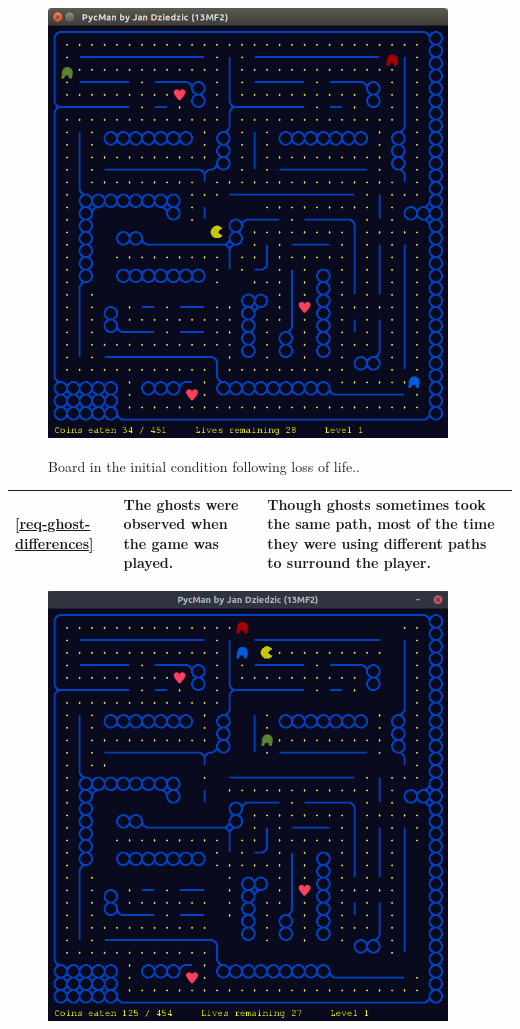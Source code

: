 \documentclass[11pt,a4paper,notitlepage]{report}
\newenvironment{img}{
	\begin{center}
		\begin{figure}[H]
			\begin{center}
			
}{
	\end{center}
		\end{figure}
			\end{center}
}
\begin{document}
\begin{center}
\begin{img}
					\includegraphics[width=300pt]{images/board-reset-after-loss-of-life.png}\\
					\caption{Board in the initial condition following loss of life..}
				\end{img}
				\begin{longtable}{ | p{2cm} | p{5cm} | p{4cm} |}
					\hline	
					\ref{req-ghost-differences}&The ghosts were observed when the game was played.&Though ghosts sometimes took the same path, most of the time they were using different paths to surround the player.\\ \hline
				\end{longtable}
				\begin{img}
					\includegraphics[width=300pt]{images/ghosts-chasing0.png}\\

\end{img}
\end{center}
\end{document}
